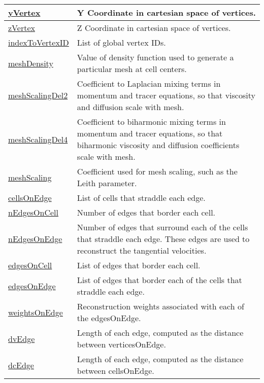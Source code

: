 {\begin{center}
\begin{longtable}{| p{2.0in} | p{4.0in} |}
	\hline
	\hyperref[subsec:var_sec_mesh_yVertex]{yVertex} & Y Coordinate in cartesian space of vertices. \\
	\hline
	\hyperref[subsec:var_sec_mesh_zVertex]{zVertex} & Z Coordinate in cartesian space of vertices. \\
	\hline
	\hyperref[subsec:var_sec_mesh_indexToVertexID]{indexToVertexID} & List of global vertex IDs. \\
	\hline
	\hyperref[subsec:var_sec_mesh_meshDensity]{meshDensity} & Value of density function used to generate a particular mesh at cell centers. \\
	\hline
	\hyperref[subsec:var_sec_mesh_meshScalingDel2]{meshScalingDel2} & Coefficient to Laplacian mixing terms in momentum and tracer equations, so that viscosity and diffusion scale with mesh. \\
	\hline
	\hyperref[subsec:var_sec_mesh_meshScalingDel4]{meshScalingDel4} & Coefficient to biharmonic mixing terms in momentum and tracer equations, so that biharmonic viscosity and diffusion coefficients scale with mesh. \\
	\hline
	\hyperref[subsec:var_sec_mesh_meshScaling]{meshScaling} & Coefficient used for mesh scaling, such as the Leith parameter. \\
	\hline
	\hyperref[subsec:var_sec_mesh_cellsOnEdge]{cellsOnEdge} & List of cells that straddle each edge. \\
	\hline
	\hyperref[subsec:var_sec_mesh_nEdgesOnCell]{nEdgesOnCell} & Number of edges that border each cell. \\
	\hline
	\hyperref[subsec:var_sec_mesh_nEdgesOnEdge]{nEdgesOnEdge} & Number of edges that surround each of the cells that straddle each edge. These edges are used to reconstruct the tangential velocities. \\
	\hline
	\hyperref[subsec:var_sec_mesh_edgesOnCell]{edgesOnCell} & List of edges that border each cell. \\
	\hline
	\hyperref[subsec:var_sec_mesh_edgesOnEdge]{edgesOnEdge} & List of edges that border each of the cells that straddle each edge. \\
	\hline
	\hyperref[subsec:var_sec_mesh_weightsOnEdge]{weightsOnEdge} & Reconstruction weights associated with each of the edgesOnEdge. \\
	\hline
	\hyperref[subsec:var_sec_mesh_dvEdge]{dvEdge} & Length of each edge, computed as the distance between verticesOnEdge. \\
	\hline
	\hyperref[subsec:var_sec_mesh_dcEdge]{dcEdge} & Length of each edge, computed as the distance between cellsOnEdge. \\

\end{longtable}
\end{center}}
